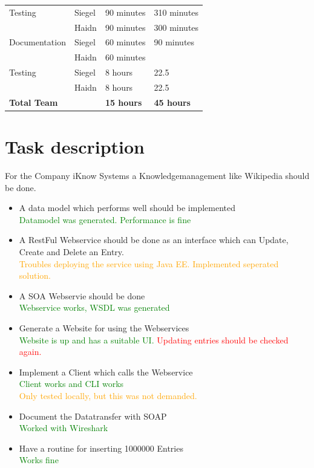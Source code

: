\documentclass[12pt]{article}
\begin{document}
\begin{table}[h]
\begin{tabular}{|p{}|p{}|p{}|p{}|}
Testing & Siegel &  90  minutes  &  310  minutes  \\  
  & Haidn &  90  minutes  & 300  minutes   \\ \hline 


Documentation  & Siegel &  60 minutes  &  90 minutes  \\  
  & Haidn &  60  minutes  &    \\ \hline 

\hline 

Testing & Siegel &  8 hours  & 22.5   \\  
  & Haidn &  8 hours   & 22.5   \\ \hline 


 \hline 
\textbf{Total Team} & & \textbf{15 hours} &\textbf{45 hours}  \\ \hline 
\end{tabular}
\end{table}

\section{Task description}
For the Company iKnow Systems a Knowledgemanagement like Wikipedia should be done.
\begin{itemize}
\item A data model which performs well should be implemented\\
\textcolor{green}{Datamodel was generated. Performance is fine}
\item A RestFul Webservice should be done as an interface which can Update, Create and Delete an Entry.\\
\textcolor{orange}{Troubles deploying the service using Java EE. Implemented seperated solution.}
\item A SOA Webservie should be done\\
\textcolor{green}{Webservice works, WSDL was generated} \\
\item Generate a Website for using the Webservices\\
\textcolor{green}{Website is up and has a suitable UI.}
\textcolor{red}{Updating entries should be checked again.}
\item Implement a Client which calls the Webservice\\
\textcolor{green}{Client works and CLI works} \\
\textcolor{orange}{Only tested locally, but this was not demanded.}
\item Document the Datatransfer with SOAP\\
\textcolor{green}{Worked with Wireshark}
\item Have a routine for inserting 1000000 Entries \\
\textcolor{green}{Works fine} \\
\end{itemize}
\end{document}
